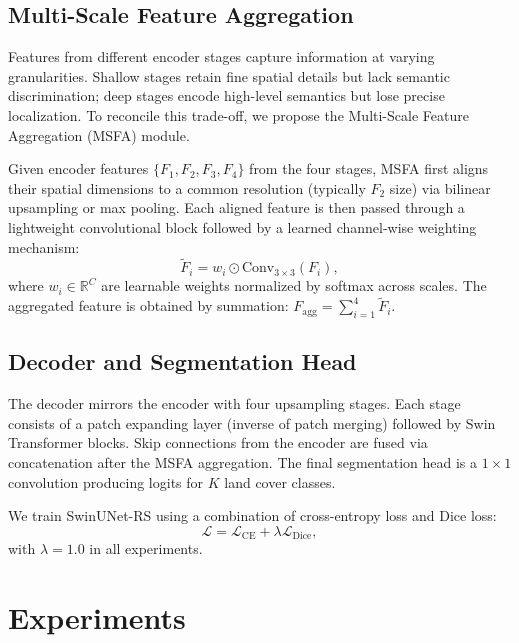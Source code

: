 \documentclass[conference]{IEEEtran}
\begin{document}
\subsection{Multi-Scale Feature Aggregation}\label{sec:msfa}

Features from different encoder stages capture information at varying granularities.
Shallow stages retain fine spatial details but lack semantic discrimination;
deep stages encode high-level semantics but lose precise localization.
To reconcile this trade-off, we propose the Multi-Scale Feature Aggregation (MSFA) module.

Given encoder features $\{F_1, F_2, F_3, F_4\}$ from the four stages,
MSFA first aligns their spatial dimensions to a common resolution (typically $F_2$ size)
via bilinear upsampling or max pooling. Each aligned feature is then passed through
a lightweight convolutional block followed by a learned channel-wise weighting mechanism:
\begin{equation}
\tilde{F}_i = w_i \odot \text{Conv}_{3\times 3}(F_i),
\end{equation}
where $w_i \in \mathbb{R}^{C}$ are learnable weights normalized by softmax across scales.
The aggregated feature is obtained by summation: $F_{\text{agg}} = \sum_{i=1}^4 \tilde{F}_i$.

\subsection{Decoder and Segmentation Head}\label{sec:decoder}

The decoder mirrors the encoder with four upsampling stages.
Each stage consists of a patch expanding layer (inverse of patch merging) followed by
Swin Transformer blocks. Skip connections from the encoder are fused via concatenation
after the MSFA aggregation. The final segmentation head is a $1\times 1$ convolution
producing logits for $K$ land cover classes.

We train SwinUNet-RS using a combination of cross-entropy loss and Dice loss:
\begin{equation}
\mathcal{L} = \mathcal{L}_{\text{CE}} + \lambda \mathcal{L}_{\text{Dice}},
\end{equation}
with $\lambda = 1.0$ in all experiments.

\section{Experiments}\label{sec:experiments}
\end{document}
